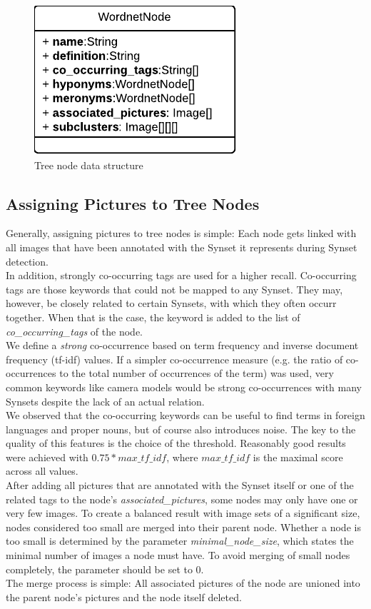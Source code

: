 \begin{figure}[h]
\centering
\includegraphics[]{images/wordnetnode_class_diagram.pdf}
\caption{Tree node data structure}
\label{fig_nodestructure}
\end{figure}


\subsection{Assigning Pictures to Tree Nodes}
\label{sec_picturestonodes}
Generally, assigning pictures to tree nodes is simple: Each node gets linked with all images that have been annotated with the Synset it represents during Synset detection. \\
In addition, strongly co-occurring tags are used for a higher recall. Co-occurring tags are those keywords that could not be mapped to any Synset. They may, however, be closely related to certain Synsets, with which they often occurr together. When that is the case, the keyword is added to the list of \emph{co\_occurring\_tags} of the node. \\
We define a \emph{strong} co-occurrence based on term frequency and inverse document frequency (tf-idf)  values.  If a simpler co-occurrence measure (e.g. the ratio of co-occurrences to the total number of occurrences of the term) was used, very common keywords like camera models would be strong co-occurrences with many Synsets despite the lack of an actual relation. \\
We observed that the co-occurring keywords can be useful to find terms in foreign languages and proper nouns, but of course also introduces noise. The key to the quality of this features is the choice of the threshold. Reasonably good results were achieved with $0.75 * max\_tf\_idf$, where $max\_tf\_idf$ is the maximal score across all values. \\

After adding all pictures that are annotated with the Synset itself or one of the related tags to the node's \emph{associated\_pictures}, some nodes may only have one or very few images. To create a balanced result with image sets of a significant size, nodes considered too small are merged into their parent node. Whether a node is too small is determined by the parameter \emph{minimal\_node\_size}, which states the minimal number of images a node must have. To avoid merging of small nodes completely, the parameter should be set to 0.\\
The merge process is simple: All associated pictures of the node are unioned into the parent node's pictures and the node itself deleted. 

